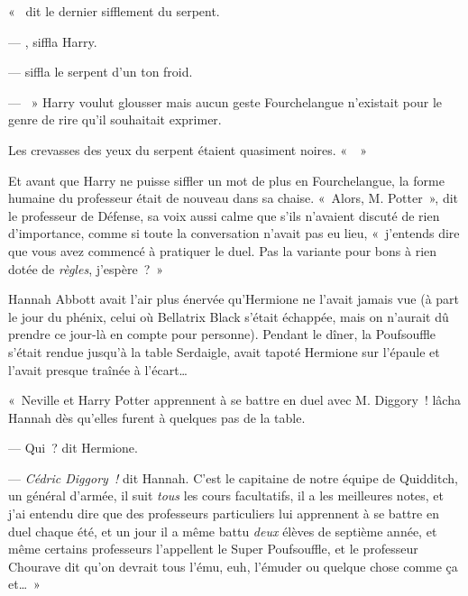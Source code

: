 «~ dit le dernier sifflement du serpent.

--- , siffla Harry.

---  siffla le serpent d'un ton froid.

--- ~» Harry voulut glousser mais aucun geste Fourchelangue n'existait pour le genre de rire qu'il souhaitait exprimer.

Les crevasses des yeux du serpent étaient quasiment noires.
«~~»

Et avant que Harry ne puisse siffler un mot de plus en Fourchelangue, la forme humaine du professeur était de nouveau dans sa chaise.
«~Alors, M. Potter~», dit le professeur de Défense, sa voix aussi calme que s'ils n'avaient discuté de rien d'importance, comme si toute la conversation n'avait pas eu lieu, «~j'entends dire que vous avez commencé à pratiquer le duel.
Pas la variante pour bons à rien dotée de \emph{règles}, j'espère~?~»

\later

Hannah Abbott avait l'air plus énervée qu'Hermione ne l'avait jamais vue (à part le jour du phénix, celui où Bellatrix Black s'était échappée, mais on n'aurait dû prendre ce jour-là en compte pour personne).
Pendant le dîner, la Poufsouffle s'était rendue jusqu'à la table Serdaigle, avait tapoté Hermione sur l'épaule et l'avait presque traînée à l'écart…

«~Neville et Harry Potter apprennent à se battre en duel avec M. Diggory~! lâcha Hannah dès qu'elles furent à quelques pas de la table.

--- Qui~? dit Hermione.

--- \emph{Cédric Diggory~!} dit Hannah.
C'est le capitaine de notre équipe de Quidditch, un général d'armée, il suit \emph{tous} les cours facultatifs, il a les meilleures notes, et j'ai entendu dire que des professeurs particuliers lui apprennent à se battre en duel chaque été, et un jour il a même battu \emph{deux} élèves de septième année, et même certains professeurs l'appellent le Super Poufsouffle, et le professeur Chourave dit qu'on devrait tous l'ému, euh, l'émuder ou quelque chose comme ça et…~»

